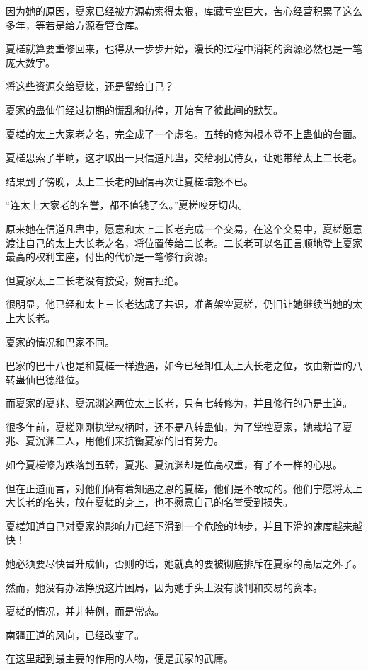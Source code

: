 \begin{this_body}
因为她的原因，夏家已经被方源勒索得太狠，库藏亏空巨大，苦心经营积累了这么多年，等若是给方源看管仓库。

夏槎就算要重修回来，也得从一步步开始，漫长的过程中消耗的资源必然也是一笔庞大数字。

将这些资源交给夏槎，还是留给自己？

夏家的蛊仙们经过初期的慌乱和彷徨，开始有了彼此间的默契。

夏槎的太上大家老之名，完全成了一个虚名。五转的修为根本登不上蛊仙的台面。

夏槎思索了半晌，这才取出一只信道凡蛊，交给羽民侍女，让她带给太上二长老。

结果到了傍晚，太上二长老的回信再次让夏槎暗怒不已。

“连太上大家老的名誉，都不值钱了么。”夏槎咬牙切齿。

原来她在信道凡蛊中，愿意和太上二长老完成一个交易，在这个交易中，夏槎愿意渡让自己的太上大长老之名，将位置传给二长老。二长老可以名正言顺地登上夏家最高的权利宝座，付出的代价是一笔修行资源。

但夏家太上二长老没有接受，婉言拒绝。

很明显，他已经和太上三长老达成了共识，准备架空夏槎，仍旧让她继续当她的太上大长老。

夏家的情况和巴家不同。

巴家的巴十八也是和夏槎一样遭遇，如今已经卸任太上大长老之位，改由新晋的八转蛊仙巴德继位。

而夏家的夏兆、夏沉渊这两位太上长老，只有七转修为，并且修行的乃是土道。

很多年前，夏槎刚刚执掌权柄时，还不是八转蛊仙，为了掌控夏家，她栽培了夏兆、夏沉渊二人，用他们来抗衡夏家的旧有势力。

如今夏槎修为跌落到五转，夏兆、夏沉渊却是位高权重，有了不一样的心思。

但在正道而言，对他们俩有着知遇之恩的夏槎，他们是不敢动的。他们宁愿将太上大长老的名头，放在夏槎的身上，也不愿意自己的名誉受到损失。

夏槎知道自己对夏家的影响力已经下滑到一个危险的地步，并且下滑的速度越来越快！

她必须要尽快晋升成仙，否则的话，她就真的要被彻底排斥在夏家的高层之外了。

然而，她没有办法挣脱这片困局，因为她手头上没有谈判和交易的资本。

夏槎的情况，并非特例，而是常态。

南疆正道的风向，已经改变了。

在这里起到最主要的作用的人物，便是武家的武庸。


\end{this_body}
